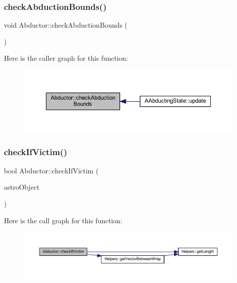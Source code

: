 \subsubsection{\texorpdfstring{check\+Abduction\+Bounds()}{checkAbductionBounds()}}
{\footnotesize\ttfamily void Abductor\+::check\+Abduction\+Bounds (\begin{DoxyParamCaption}{ }\end{DoxyParamCaption})}

Here is the caller graph for this function\+:
\nopagebreak
\begin{figure}[H]
\begin{center}
\leavevmode
\includegraphics[width=350pt]{class_abductor_a1a0d06816d3572995a0ce1e0426c6d68_icgraph}
\end{center}
\end{figure}
\mbox{\label{class_abductor_acbe9315d3199bb9231c0a3d45d07d8f6}} 
\subsubsection{\texorpdfstring{check\+If\+Victim()}{checkIfVictim()}}
{\footnotesize\ttfamily bool Abductor\+::check\+If\+Victim (\begin{DoxyParamCaption}\item[{const std\+::shared\+\_\+ptr$<$ \hyperlink{class_game_object}{Game\+Object} $>$ \&}]{astro\+Object }\end{DoxyParamCaption})}

Here is the call graph for this function\+:
\nopagebreak
\begin{figure}[H]
\begin{center}
\leavevmode
\includegraphics[width=350pt]{class_abductor_acbe9315d3199bb9231c0a3d45d07d8f6_cgraph}
\end{center}
\end{figure}
\mbox{\label{class_abductor_a4b86fdcd63a060c53da22f092a113b24}} 
